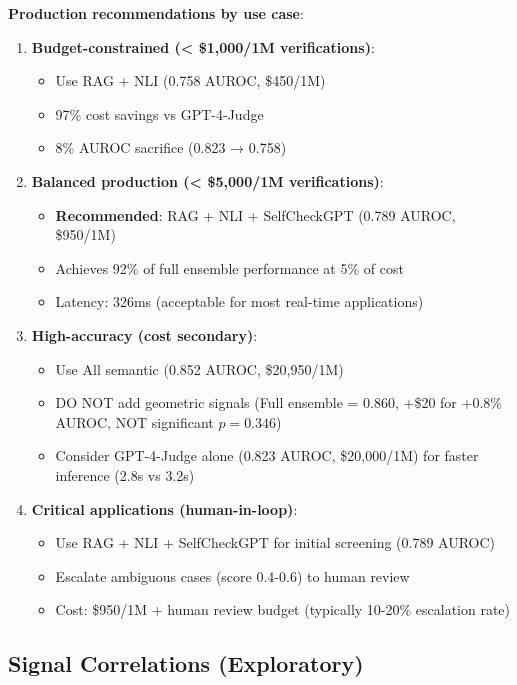 \documentclass[11pt]{article}
\begin{document}
\textbf{Production recommendations by use case}:

\begin{enumerate}
\item \textbf{Budget-constrained (< \$1,000/1M verifications)}:
  \begin{itemize}
  \item Use RAG + NLI (0.758 AUROC, \$450/1M)
  \item 97\% cost savings vs GPT-4-Judge
  \item 8\% AUROC sacrifice (0.823 → 0.758)
  \end{itemize}

\item \textbf{Balanced production (< \$5,000/1M verifications)}:
  \begin{itemize}
  \item \textbf{Recommended}: RAG + NLI + SelfCheckGPT (0.789 AUROC, \$950/1M)
  \item Achieves 92\% of full ensemble performance at 5\% of cost
  \item Latency: 326ms (acceptable for most real-time applications)
  \end{itemize}

\item \textbf{High-accuracy (cost secondary)}:
  \begin{itemize}
  \item Use All semantic (0.852 AUROC, \$20,950/1M)
  \item DO NOT add geometric signals (Full ensemble = 0.860, +\$20 for +0.8\% AUROC, NOT significant $p=0.346$)
  \item Consider GPT-4-Judge alone (0.823 AUROC, \$20,000/1M) for faster inference (2.8s vs 3.2s)
  \end{itemize}

\item \textbf{Critical applications (human-in-loop)}:
  \begin{itemize}
  \item Use RAG + NLI + SelfCheckGPT for initial screening (0.789 AUROC)
  \item Escalate ambiguous cases (score 0.4-0.6) to human review
  \item Cost: \$950/1M + human review budget (typically 10-20\% escalation rate)
  \end{itemize}
\end{enumerate}

\subsection{Signal Correlations (Exploratory)}
\end{document}
